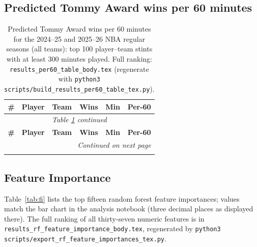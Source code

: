 \documentclass[11pt]{article}
\begin{document}
\subsection{Predicted Tommy Award wins per 60 minutes}
{\footnotesize
\setlength{\tabcolsep}{4pt}
\renewcommand{\arraystretch}{1.05}
\begin{longtable}{@{}r l l r r r@{}}
  \caption{Predicted Tommy Award wins per 60 minutes for the 2024--25 and 2025--26 NBA regular seasons (all teams): top 100 player--team stints with at least 300 minutes played. Full ranking: \texttt{results\_per60\_table\_body.tex} (regenerate with \texttt{python3 scripts/build\_results\_per60\_table\_tex.py}).}\label{tab:per60}\\
  \toprule
  \textbf{\#} & \textbf{Player} & \textbf{Team} & \textbf{Wins} & \textbf{Min} & \textbf{Per-60} \\
  \endfirsthead
  \multicolumn{6}{c}{\textit{Table \ref{tab:per60} continued}}\\
  \toprule
  \textbf{\#} & \textbf{Player} & \textbf{Team} & \textbf{Wins} & \textbf{Min} & \textbf{Per-60} \\
  \endhead
  \midrule
  \multicolumn{6}{r}{\textit{Continued on next page}}\\
  \endfoot
  \bottomrule
  \endlastfoot
  
\end{longtable}
}

\subsection{Feature Importance}
Table~\ref{tab:fi} lists the top fifteen random forest feature importances; values match the bar chart in the analysis notebook (three decimal places as displayed there). The full ranking of all thirty-seven numeric features is in \texttt{results\_rf\_feature\_importance\_body.tex}, regenerated by \texttt{python3 scripts/export\_rf\_feature\_importances\_tex.py}.
\end{document}
